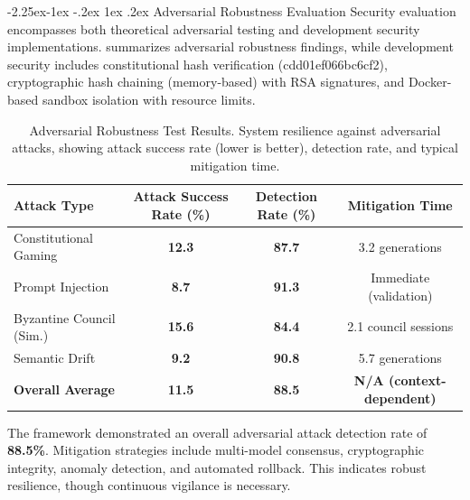 \documentclass[manuscript,screen,9pt]{acmart}
\makeatletter
\renewcommand\subsection{\@startsection{subsection}{2}{\z@}%
  {-2.25ex\@plus -1ex \@minus -.2ex}%
  {1ex \@plus .2ex}%
  {\normalfont\large\bfseries}}
\newcommand{\tablesize}{\footnotesize}
\newcommand{\tablenumfmt}[1]{\textbf{#1}}
\makeatother
\begin{document}
\subsection{Adversarial Robustness Evaluation}
\label{subsec:adversarial_robustness_discussion}
Security evaluation encompasses both theoretical adversarial testing and development security implementations.  summarizes adversarial robustness findings, while development security includes constitutional hash verification (cdd01ef066bc6cf2), cryptographic hash chaining (memory-based) with RSA signatures, and Docker-based sandbox isolation with resource limits.
\begin{table}[htbp]
\centering
\caption{Adversarial Robustness Test Results. System resilience against adversarial attacks, showing attack success rate (lower is better), detection rate, and typical mitigation time.}
\label{tab:adversarial_results}
\tablesize
\begin{tabular}{@{}lccc@{}}
\toprule
\textbf{Attack Type} & \textbf{Attack Success Rate (\%)} & \textbf{Detection Rate (\%)} & \textbf{Mitigation Time} \\
\midrule
Constitutional Gaming & \tablenumfmt{12.3} & \tablenumfmt{87.7} & 3.2 generations \\
Prompt Injection      & \tablenumfmt{8.7}  & \tablenumfmt{91.3} & Immediate (validation) \\
Byzantine Council (Sim.) & \tablenumfmt{15.6} & \tablenumfmt{84.4} & 2.1 council sessions \\
Semantic Drift        & \tablenumfmt{9.2}  & \tablenumfmt{90.8} & 5.7 generations \\
\midrule
\textbf{Overall Average} & \textbf{\tablenumfmt{11.5}} & \textbf{\tablenumfmt{88.5}} & \textbf{N/A (context-dependent)} \\
\bottomrule
\end{tabular}
\end{table}
The framework demonstrated an overall adversarial attack detection rate of \textbf{88.5\%}. Mitigation strategies include multi-model consensus, cryptographic integrity, anomaly detection, and automated rollback. This indicates robust resilience, though continuous vigilance is necessary.
\end{document}

